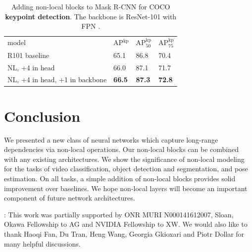 \documentclass[10pt,twocolumn,letterpaper]{article}
\newcommand{\bd}[1]{\textbf{#1}}
\newcommand{\tablestyle}[2]{\setlength{\tabcolsep}{#1}\renewcommand{\arraystretch}{#2}\centering\footnotesize}
\begin{document}
\begin{table}[t]
\centering
\small
\tablestyle{4pt}{1.05}
\begin{tabular}{l|x{22}x{22}x{22}}
 model & AP$^\text{kp}$ & AP$^\text{kp}_{50}$ & AP$^\text{kp}_{75}$\\ [.1em]
\shline
R101 baseline  & 65.1 & 86.8 & 70.4 \\
\hline
NL, +4 in head & 66.0 & 87.1 & 71.7 \\
NL, +4 in head, +1 in backbone  & \bd{66.5} & \bd{87.3} & \bd{72.8}
\end{tabular}
\vspace{0.5em}
\caption{Adding non-local blocks to Mask R-CNN for COCO \bd{keypoint detection}. The backbone is ResNet-101 with FPN \cite{Lin2017}.\vspace{-1em}}
\label{tab:coco_kp}
\end{table}


\vspace{-0.5em}
\section{Conclusion}
\vspace{-0.5em}
We presented a new class of neural networks which capture long-range dependencies via non-local operations. Our non-local blocks can be combined with any existing architectures. We show the significance of non-local modeling for the tasks of video classification, object detection and segmentation, and pose estimation. On all tasks, a simple addition of non-local blocks provides solid improvement over baselines. We hope non-local layers will become an important component of future network architectures.

{\footnotesize
{: This work was partially supported by ONR MURI N000141612007, Sloan, Okawa Fellowship to AG and NVIDIA Fellowship to XW. We would also like to thank Haoqi Fan, Du Tran, Heng Wang, Georgia Gkioxari and Piotr Dollar for many helpful discussions.}
}


{
\small


}
\end{document}
